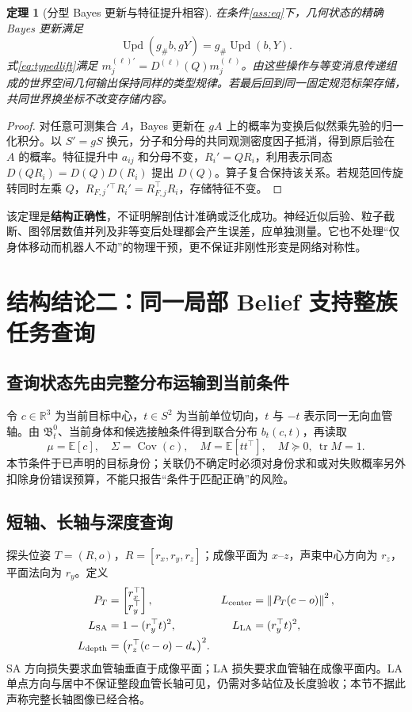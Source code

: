 \documentclass[UTF8,fontset=fandol,11pt,a4paper]{ctexart}
\theoremstyle{plain}
\newtheorem{theorem}{定理}[section]
\theoremstyle{definition}
\theoremstyle{remark}
\numberwithin{equation}{section}
\newcommand{\R}{\mathbb R}
\newcommand{\E}{\mathbb E}
\newcommand{\B}{\mathfrak B}
\newcommand{\norm}[1]{\left\lVert#1\right\rVert}
\DeclareMathOperator{\tr}{tr}
\DeclareMathOperator{\Cov}{Cov}
\begin{document}
\begin{theorem}[分型 Bayes 更新与特征提升相容]
\label{thm:equivariance}
在条件\ref{ass:eq}下，几何状态的精确 Bayes 更新满足
\begin{equation}
 \operatorname{Upd}(g_\#b,gY)=g_\#\operatorname{Upd}(b,Y).
 \label{eq:bayesequiv}
\end{equation}
式\eqref{eq:typedlift}满足 $m_j^{(\ell)\prime}=D^{(\ell)}(Q)m_j^{(\ell)}$。由这些操作与等变消息传递组成的世界空间几何输出保持同样的类型规律。若最后回到同一固定规范标架存储，共同世界换坐标不改变存储内容。
\end{theorem}
\begin{proof}
对任意可测集合 $A$，Bayes 更新在 $gA$ 上的概率为变换后似然乘先验的归一化积分。以 $S'=gS$ 换元，分子和分母的共同观测密度因子抵消，得到原后验在 $A$ 的概率。特征提升中 $a_{ij}$ 和分母不变，$R_i'=QR_i$，利用表示同态 $D(QR_i)=D(Q)D(R_i)$ 提出 $D(Q)$。算子复合保持该关系。若规范回传旋转同时左乘 $Q$，$R_{F,j}'{}^\top R_i'=R_{F,j}^\top R_i$，存储特征不变。
\end{proof}

该定理是\textbf{结构正确性}，不证明解剖估计准确或泛化成功。神经近似后验、粒子截断、图邻居数值并列及非等变后处理都会产生误差，应单独测量。它也不处理“仅身体移动而机器人不动”的物理干预，更不保证非刚性形变是网络对称性。

\section{结构结论二：同一局部 Belief 支持整族任务查询}
\label{sec:queries}
\subsection{查询状态先由完整分布运输到当前条件}
令 $c\in\R^3$ 为当前目标中心，$t\in S^2$ 为当前单位切向，$t$ 与 $-t$ 表示同一无向血管轴。由 $\B_t^0$、当前身体和候选接触条件得到联合分布 $b_t(c,t)$，再读取
\begin{equation}
 \mu=\E[c],\quad \Sigma=\Cov(c),\quad M=\E[tt^\top],
 \quad M\succeq0,\ \tr M=1.
 \label{eq:summary}
\end{equation}
本节条件于已声明的目标身份；关联仍不确定时必须对身份求和或对失败概率另外扣除身份错误预算，不能只报告“条件于匹配正确”的风险。

\subsection{短轴、长轴与深度查询}
探头位姿 $T=(R,o)$，$R=[r_x,r_y,r_z]$；成像平面为 $x$--$z$，声束中心方向为 $r_z$，平面法向为 $r_y$。定义
\begin{align}
 P_T&=\begin{bmatrix}r_x^\top\\r_y^\top\end{bmatrix},
 &L_{\rm center}&=\norm{P_T(c-o)}^2,\\
 L_{\rm SA}&=1-(r_y^\top t)^2,
 &L_{\rm LA}&=(r_y^\top t)^2,\\
 L_{\rm depth}&=\big(r_z^\top(c-o)-d_\star\big)^2.
 \label{eq:losses}
\end{align}
SA 方向损失要求血管轴垂直于成像平面；LA 损失要求血管轴在成像平面内。LA 单点方向与居中不保证整段血管长轴可见，仍需对多站位及长度验收；本节不据此声称完整长轴图像已经合格。
\end{document}

